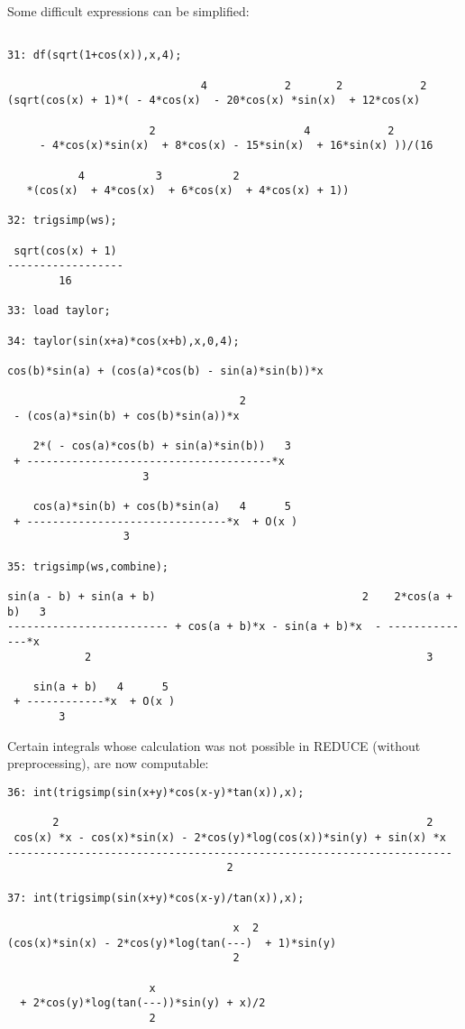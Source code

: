 Some difficult expressions can be simplified:
{\small
\begin{verbatim}

31: df(sqrt(1+cos(x)),x,4);

                              4            2       2            2
(sqrt(cos(x) + 1)*( - 4*cos(x)  - 20*cos(x) *sin(x)  + 12*cos(x)

                      2                       4            2
     - 4*cos(x)*sin(x)  + 8*cos(x) - 15*sin(x)  + 16*sin(x) ))/(16

           4           3           2
   *(cos(x)  + 4*cos(x)  + 6*cos(x)  + 4*cos(x) + 1))

32: trigsimp(ws);

 sqrt(cos(x) + 1)
------------------
        16

33: load taylor;

34: taylor(sin(x+a)*cos(x+b),x,0,4);

cos(b)*sin(a) + (cos(a)*cos(b) - sin(a)*sin(b))*x

                                    2
 - (cos(a)*sin(b) + cos(b)*sin(a))*x

    2*( - cos(a)*cos(b) + sin(a)*sin(b))   3
 + --------------------------------------*x
                     3

    cos(a)*sin(b) + cos(b)*sin(a)   4      5
 + -------------------------------*x  + O(x )
                  3

35: trigsimp(ws,combine);

sin(a - b) + sin(a + b)                                2    2*cos(a + b)   3
------------------------- + cos(a + b)*x - sin(a + b)*x  - --------------*x
            2                                                    3

    sin(a + b)   4      5
 + ------------*x  + O(x )
        3
\end{verbatim}
}\noindent
Certain integrals whose calculation was not possible in REDUCE
(without preprocessing), are now computable:
{\small
\begin{verbatim}
36: int(trigsimp(sin(x+y)*cos(x-y)*tan(x)),x);

       2                                                         2
 cos(x) *x - cos(x)*sin(x) - 2*cos(y)*log(cos(x))*sin(y) + sin(x) *x
---------------------------------------------------------------------
                                  2

37: int(trigsimp(sin(x+y)*cos(x-y)/tan(x)),x);

                                   x  2
(cos(x)*sin(x) - 2*cos(y)*log(tan(---)  + 1)*sin(y)
                                   2

                      x
  + 2*cos(y)*log(tan(---))*sin(y) + x)/2
                      2
\end{verbatim}
}\noindent

